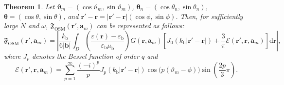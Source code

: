 \documentclass[3p,10pt]{elsarticle}
\newcommand{\eps}{\varepsilon}
\newcommand{\kb}{k_{\mathrm{b}}}
\newcommand{\epsb}{\varepsilon_{\mathrm{b}}}
\newcommand{\mub}{\mu_{\mathrm{b}}}
\newcommand{\rd}{\mathrm{d}}
\newcommand{\ma}{\mathbf{a}}
\newcommand{\mb}{\mathbf{b}}
\newcommand{\mr}{\mathbf{r}}
\newcommand{\vt}{\boldsymbol{\theta}}
\newcommand{\vv}{\boldsymbol{\vartheta}}
\DeclareMathOperator*{\osm}{OSM}
\theoremstyle{plain}
\newtheorem{theorem}{Theorem}[section]
\theoremstyle{remark}
\begin{document}
\begin{theorem}\label{OSM_Single}
  Let $\vv_m=(\cos\vartheta_m,\sin\vartheta_m)$, $\vt_n=(\cos\theta_n,\sin\theta_n)$, $\vt=(\cos\theta,\sin\theta)$, and $\mr'-\mr=|\mr'-\mr|(\cos\phi,\sin\phi)$. Then, for sufficiently large $N$ and $\omega$, $\mathfrak{F}_{\osm}(\mr',\ma_m)$ can be represented as follows:
  \begin{equation}\label{Structure_Single}
    \mathfrak{F}_{\osm}(\mr',\ma_m)=\left|\frac{\kb}{6|\mb|}\int_D\left(\frac{\eps(\mr)-\epsb}{\epsb\mub}\right)G(\mr,\ma_m)\left[J_0(\kb|\mr'-\mr|)+\frac{3}{\pi}\mathcal{E}(\mr',\mr,\ma_m)\right]\rd\mr\right|,
  \end{equation}
where $J_p$ denotes the Bessel function of order $q$ and
\begin{equation}\label{DisturbFactor}
\mathcal{E}(\mr',\mr,\ma_m)=\sum_{p=1}^{\infty}\frac{(-i)^p}{p}J_p(\kb|\mr'-\mr|)\cos\big(p(\vartheta_m-\phi)\big)\sin\left(\frac{2p}{3}\pi\right).
\end{equation}
\end{theorem}
\end{document}
